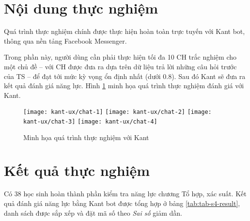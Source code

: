 \section{Nội dung thực nghiệm}
Quá trình thực nghiệm chính được thực hiện hoàn toàn trực tuyến với Kant bot, thông qua nền tảng Facebook Messenger.\par
Trong phần này, người dùng cần phải thực hiện tối đa 10 CH trắc nghiệm \parencite{le2015xay} cho một chủ đề – với CH được đưa ra dựa trên dữ liệu trả lời những câu hỏi trước của TS – để đạt tới mức kỳ vọng ổn định nhất (dưới $0.8$). Sau đó Kant sẽ đưa ra kết quả đánh giá năng lực. Hình \ref{fig:fig-c4-chatbot-demo} minh họa quá trình thực nghiệm đánh giá với Kant.
\begin{figure}[htb!]\centering
	\texttt{[image: kant-ux/chat-1]}
	\texttt{[image: kant-ux/chat-2]}
	\texttt{[image: kant-ux/chat-3]}
	\texttt{[image: kant-ux/chat-4]}
	\caption{Minh họa quá trình thực nghiệm với Kant}
	\label{fig:fig-c4-chatbot-demo}
\end{figure}\par

\section{Kết quả thực nghiệm}

Có 38 học sinh hoàn thành phần kiểm tra năng lực chương Tổ hợp, xác suất. Kết quả đánh giá năng lực bằng Kant bot được tổng hợp ở bảng \ref{tab:tab-s4-result}, danh sách được sắp xếp và đặt mã số theo \textit{Sai số} giảm dần.

